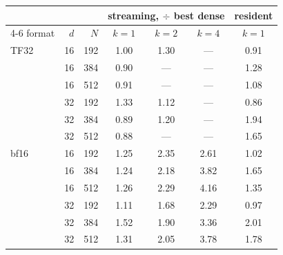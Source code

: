 \begin{tabular}{lrrcccc}
\toprule
& & & \multicolumn{3}{c}{\textbf{streaming}, $\div$ best dense} & \textbf{resident} \\
\cmidrule(lr){4-6}
format & $d$ & $N$ & $k{=}1$ & $k{=}2$ & $k{=}4$ & $k{=}1$ \\
\midrule
TF32 & 16 & 192 & 1.00 & 1.30 & --- & 0.91 \\
 & 16 & 384 & 0.90 & --- & --- & 1.28 \\
 & 16 & 512 & 0.91 & --- & --- & 1.08 \\
 & 32 & 192 & 1.33 & 1.12 & --- & 0.86 \\
 & 32 & 384 & 0.89 & 1.20 & --- & 1.94 \\
 & 32 & 512 & 0.88 & --- & --- & 1.65 \\
\midrule
bf16 & 16 & 192 & 1.25 & 2.35 & 2.61 & 1.02 \\
 & 16 & 384 & 1.24 & 2.18 & 3.82 & 1.65 \\
 & 16 & 512 & 1.26 & 2.29 & 4.16 & 1.35 \\
 & 32 & 192 & 1.11 & 1.68 & 2.29 & 0.97 \\
 & 32 & 384 & 1.52 & 1.90 & 3.36 & 2.01 \\
 & 32 & 512 & 1.31 & 2.05 & 3.78 & 1.78 \\
\bottomrule
\end{tabular}%
